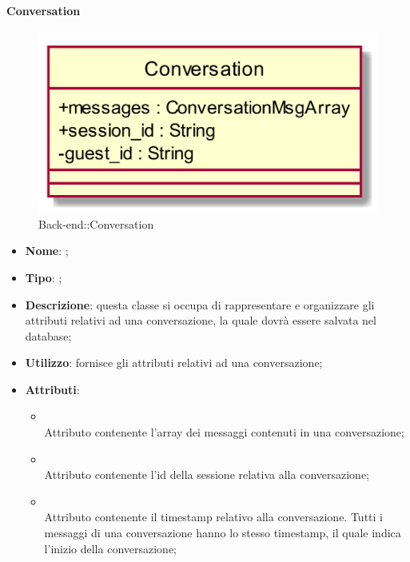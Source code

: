\hypertarget{Conversation_label}{\paragraph{Conversation}}
\begin{figure}[h]
	\centering
	\includegraphics[width=\textwidth,height=\textheight,keepaspectratio]{images/ClassConversation.png}
	\caption{Back-end::Conversation}
\end{figure}
\begin{itemize}
	\item \textbf{Nome}: ;
	\item \textbf{Tipo}: ;
	\item \textbf{Descrizione}: questa classe si occupa di rappresentare e organizzare gli attributi relativi ad una conversazione, la quale dovrà essere salvata nel database;
	\item \textbf{Utilizzo}: fornisce gli attributi relativi ad una conversazione;
	\item \textbf{Attributi}:
	\begin{itemize}
		\item[]  \\
		Attributo contenente l'array dei messaggi contenuti in una conversazione;
		\item[]  \\
		Attributo contenente l'id della sessione relativa alla conversazione;
		\item[]  \\
		Attributo contenente il timestamp relativo alla conversazione. Tutti i messaggi di una conversazione  hanno lo stesso timestamp, il quale indica l'inizio della conversazione;
	\end{itemize}
\end{itemize}

